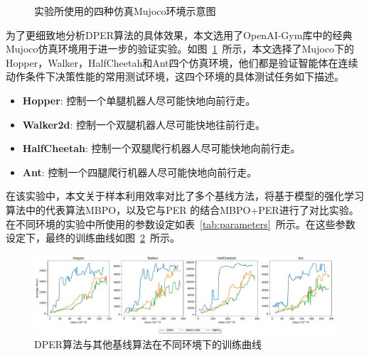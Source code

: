 \begin{figure}[t]
{        \label{fig:cheetah}
    }
    \caption{实验所使用的四种仿真Mujoco环境示意图}
    \label{fig:env-figures}
\end{figure}

为了更细致地分析DPER算法的具体效果，本文选用了OpenAI-Gym库中的经典Mujoco仿真环境\cite{todorov2012mujoco}用于进一步的验证实验。如图~\ref{fig:env-figures}~所示，本文选择了Mujoco下的Hopper，Walker，HalfCheetah和Ant四个仿真环境，他们都是验证智能体在连续动作条件下决策性能的常用测试环境，这四个环境的具体测试任务如下描述。

\begin{itemize}
    \item \textbf{Hopper}: 控制一个单腿机器人尽可能快地向前行走。
    \item \textbf{Walker2d}: 控制一个双腿机器人尽可能快地往前行走。
    \item \textbf{HalfCheetah}: 控制一个双腿爬行机器人尽可能快地向前行走。
    \item \textbf{Ant}: 控制一个四腿爬行机器人尽可能快地向前行走。
\end{itemize}

在该实验中，本文关于样本利用效率对比了多个基线方法，将基于模型的强化学习算法中的代表算法MBPO\cite{janner2019trust}，以及它与PER \cite{schaul2016prioritized}的结合MBPO+PER进行了对比实验。在不同环境的实验中所使用的参数设定如表~\ref{tab:parameters}~所示。在这些参数设定下，最终的训练曲线如图~\ref{fig:dper-performance}~所示。

\begin{figure}[t]
  \centering
  \includegraphics[width=\textwidth]{figures/dler.pdf}
  \caption{DPER算法与其他基线算法在不同环境下的训练曲线}
  \label{fig:dper-performance}
\end{figure}

